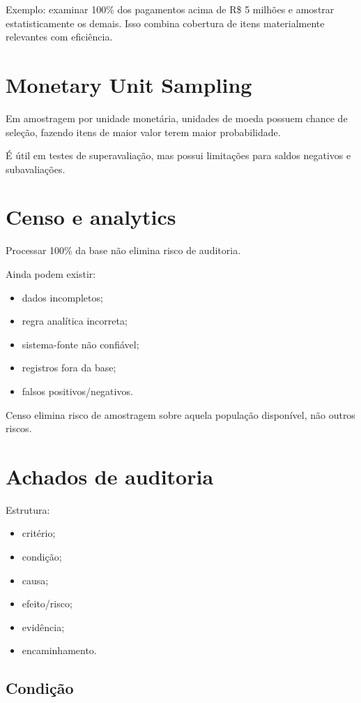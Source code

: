 Exemplo: examinar 100\% dos pagamentos acima de R\$ 5 milhões e amostrar estatisticamente os demais. Isso combina cobertura de itens materialmente relevantes com eficiência.

\section{Monetary Unit Sampling}

Em amostragem por unidade monetária, unidades de moeda possuem chance de seleção, fazendo itens de maior valor terem maior probabilidade.

É útil em testes de superavaliação, mas possui limitações para saldos negativos e subavaliações.

\section{Censo e analytics}

Processar 100\% da base não elimina risco de auditoria.

Ainda podem existir:
\begin{itemize}
\item dados incompletos;
\item regra analítica incorreta;
\item sistema-fonte não confiável;
\item registros fora da base;
\item falsos positivos/negativos.
\end{itemize}

Censo elimina risco de amostragem sobre aquela população disponível, não outros riscos.

\section{Achados de auditoria}

Estrutura:
\begin{itemize}
\item critério;
\item condição;
\item causa;
\item efeito/risco;
\item evidência;
\item encaminhamento.
\end{itemize}

\subsection{Condição}

